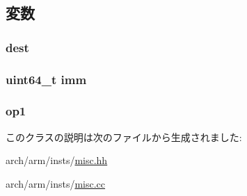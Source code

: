 \subsection{変数}
\hypertarget{classRegImmRegOp_aec72e8e45bdc87abeeeb75d2a8a9a716}{
\subsubsection[{dest}]{ {\bf dest}}}
\label{classRegImmRegOp_aec72e8e45bdc87abeeeb75d2a8a9a716}
\hypertarget{classRegImmRegOp_a2b4406ad2843b5aa12d244d01d8fdc69}{
\subsubsection[{imm}]{\setlength{\rightskip}{0pt plus 5cm}uint64\_\-t {\bf imm}}}
\label{classRegImmRegOp_a2b4406ad2843b5aa12d244d01d8fdc69}
\hypertarget{classRegImmRegOp_a4c465c43ad568f8bcf8ae71480e9cfea}{
\subsubsection[{op1}]{ {\bf op1}}}
\label{classRegImmRegOp_a4c465c43ad568f8bcf8ae71480e9cfea}


このクラスの説明は次のファイルから生成されました:\begin{DoxyCompactItemize}
\item 
arch/arm/insts/\hyperlink{arch_2arm_2insts_2misc_8hh}{misc.hh}\item 
arch/arm/insts/\hyperlink{arch_2arm_2insts_2misc_8cc}{misc.cc}\end{DoxyCompactItemize}
